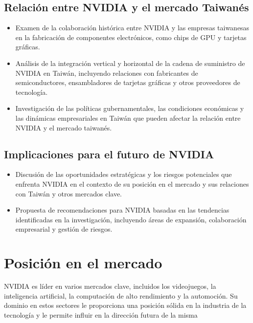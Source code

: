 \documentclass[twocolumn, 12pt]{article}
\begin{document}
\subsection*{Relación entre NVIDIA y el mercado Taiwanés}

\begin{itemize}
      \item Examen de la colaboración histórica entre NVIDIA y las
            empresas taiwanesas en la fabricación de componentes
            electrónicos, como chips de GPU y tarjetas gráficas.

      \item Análisis de la integración vertical y horizontal de la
            cadena de suministro de NVIDIA en Taiwán, incluyendo
            relaciones con fabricantes de semiconductores,
            ensambladores de tarjetas gráficas y otros proveedores de
            tecnología.

      \item Investigación de las políticas gubernamentales,
            las condiciones económicas y las dinámicas empresariales en
            Taiwán que pueden afectar la relación entre NVIDIA y el mercado
            taiwanés.
\end{itemize}

\subsection*{Implicaciones para el futuro de NVIDIA}

\begin{itemize}
      \item Discusión de las oportunidades estratégicas y los riesgos
            potenciales que enfrenta NVIDIA en el contexto de su posición
            en el mercado y sus relaciones con Taiwán y otros mercados clave.

      \item Propuesta de recomendaciones para NVIDIA basadas en
            las tendencias identificadas en la investigación, incluyendo
            áreas de expansión, colaboración empresarial y gestión de riesgos.
\end{itemize}

\section{Posición en el mercado}

NVIDIA es líder en varios mercados clave, incluidos los videojuegos,
la inteligencia artificial, la computación de alto rendimiento y
la automoción. Su dominio en estos sectores le proporciona una
posición sólida en la industria de la tecnología y le permite
influir en la dirección futura de la misma
\end{document}
